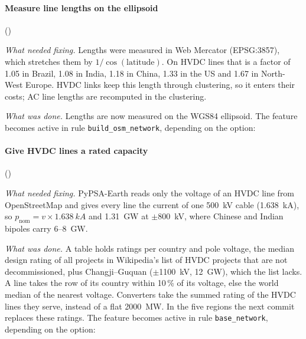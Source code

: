 \begin{table}[htb]
  \centering\small
  \caption{Real ways (a \textit{Way} is an OSM data type consisting of an ordered list of nodes forming a polyline or closed shape) with several voltages and one total of cables, and the circuits per voltage they get without and with the commit.
  The first is the Grand Coulee--Schultz line, tagged with two names and two circuits.
  Lines below \SI{200}{kV} are dropped afterwards, so the values at \SI{115}{kV} and \SI{110}{kV} do not reach the network.
  NWE: North-West Europe.
  ``Ways alike'': ways of the base network in that region with the same number of voltages, cables and \texttt{circuits} tag.}
  \label{tab:circuits}
  
\end{table}

\paragraph{Measure line lengths on the ellipsoid} ()

\textit{What needed fixing.}
Lengths were measured in Web Mercator (EPSG:3857), which stretches them by $1/\cos(\text{latitude})$.
On HVDC lines that is a factor of 1.05 in Brazil, 1.08 in India, 1.18 in China, 1.33 in the US and 1.67 in North-West Europe.
HVDC links keep this length through clustering, so it enters their costs; AC line lengths are recomputed in the clustering.

\textit{What was done.}
Lengths are now measured on the WGS84 ellipsoid.
The feature becomes active in rule \texttt{build\_osm\_network}, depending on the option:

\paragraph{Give HVDC lines a rated capacity} ()

\textit{What needed fixing.}
PyPSA-Earth reads only the voltage of an HVDC line from OpenStreetMap and gives every line the current of one \SI{500}{kV} cable (\SI{1.638}{kA}), so $p_\text{nom} = v \times \SI{1.638}{kA}$ and \SI{1.31}{GW} at $\pm$\SI{800}{kV}, where Chinese and Indian bipoles carry 6--\SI{8}{GW}.

\textit{What was done.}
A table holds ratings per country and pole voltage, the median design rating of all projects in Wikipedia's list of HVDC projects that are not decommissioned, plus Changji--Guquan ($\pm$\SI{1100}{kV}, \SI{12}{GW}), which the list lacks.
A line takes the row of its country within 10\,\% of its voltage, else the world median of the nearest voltage.
Converters take the summed rating of the HVDC lines they serve, instead of a flat \SI{2000}{MW}.
In the five regions the next commit replaces these ratings.
The feature becomes active in rule \texttt{base\_network}, depending on the option:


